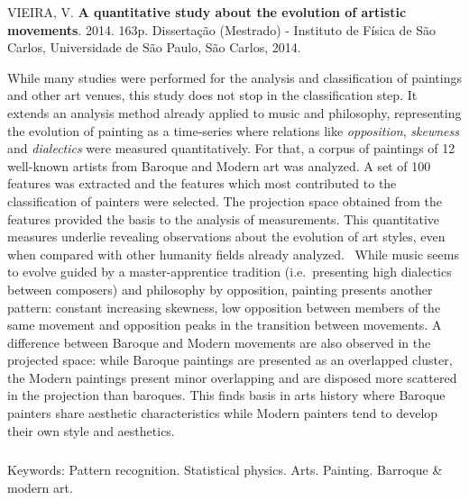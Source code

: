 \afterpage{\blankpage}

\begin{abstract2}
\vspace{-10mm}
VIEIRA, V. \textbf{A quantitative study about the evolution of artistic movements}. 2014. 163p. Dissertação (Mestrado) - Instituto de Física de São Carlos, Universidade de São Paulo, São Carlos, 2014.
\vspace{15mm}

  While many studies were performed for the analysis and
  classification of paintings and other art venues, this study does
  not stop in the classification step. It extends an analysis method
  already applied to music and philosophy, representing the evolution
  of painting as a time-series where relations like
  \textit{opposition}, \textit{skewness} and \textit{dialectics} were
  measured quantitatively. For that, a corpus of paintings of 12
  well-known artists from Baroque and Modern art was analyzed. A set
  of 100 features was extracted and the features which most contributed
  to the classification of painters were selected. The projection
  space obtained from the features provided the basis to the analysis
  of measurements. This quantitative measures underlie revealing
  observations about the evolution of art styles, even when compared
  with other humanity fields already analyzed.~\cite{vieira} While
  music seems to evolve guided by a master-apprentice tradition
  (i.e.\ presenting high dialectics between composers) and philosophy
  by opposition, painting presents another pattern: constant
  increasing skewness, low opposition between members of the same
  movement and opposition peaks in the transition between movements. A
  difference between Baroque and Modern movements are also observed in
  the projected space: while Baroque paintings are presented as an
  overlapped cluster, the Modern paintings present minor overlapping
  and are disposed more scattered in the projection than
  baroques. This finds basis in arts history where Baroque painters
  share aesthetic characteristics while Modern painters tend to
  develop their own style and aesthetics.

$\phantom{linha em branco}$\\
Keywords: Pattern recognition. Statistical physics. Arts. Painting. Barroque \& modern art.

\end{abstract2}
